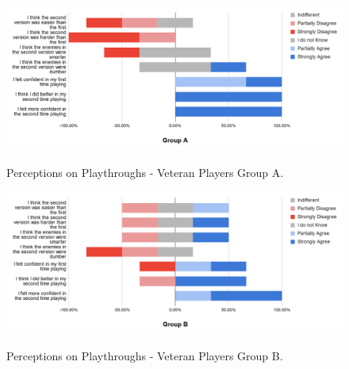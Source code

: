 \begin{figure}[!ht]
    \begin{center}
    \caption{Perceptions on Playthroughs - Veteran Players Group A.}
        \includegraphics[width=36em]{figures/fig-perception-versions-veteran-players-group-a.png}
        \label{fig:perception-playthrough-veteran-players-group-a}
    \end{center}
\end{figure}

\begin{figure}[!ht]
    \begin{center}
    \caption{Perceptions on Playthroughs - Veteran Players Group B.}
        \includegraphics[width=36em]{figures/fig-perception-versions-veteran-players-group-b.png}
        \label{fig:perception-playthrough-veteran-players-group-b}
    \end{center}
\end{figure}



